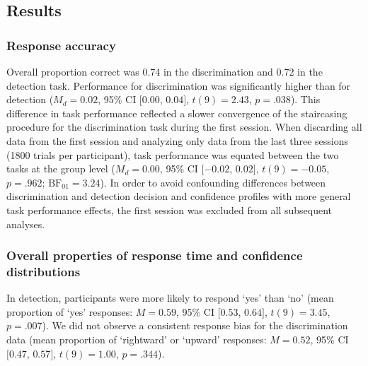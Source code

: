 \documentclass[12pt,twoside]{reedthesis}
\begin{document}
\hypertarget{results-4}{%
\subsection{Results}\label{results-4}}

\hypertarget{response-accuracy}{%
\subsubsection{Response accuracy}\label{response-accuracy}}

Overall proportion correct was 0.74 in the discrimination and 0.72 in the detection task. Performance for discrimination was significantly higher than for detection (\(M_d = 0.02\), 95\% CI \([0.00\), \(0.04]\), \(t(9) = 2.43\), \(p = .038\)). This difference in task performance reflected a slower convergence of the staircasing procedure for the discrimination task during the first session. When discarding all data from the first session and analyzing only data from the last three sessions (1800 trials per participant), task performance was equated between the two tasks at the group level (\(M_d = 0.00\), 95\% CI \([-0.02\), \(0.02]\), \(t(9) = -0.05\), \(p = .962\); \(\mathrm{BF}_{\textrm{01}} = 3.24\)). In order to avoid confounding differences between discrimination and detection decision and confidence profiles with more general task performance effects, the first session was excluded from all subsequent analyses.

\hypertarget{overall-properties-of-response-time-and-confidence-distributions}{%
\subsubsection{Overall properties of response time and confidence distributions}\label{overall-properties-of-response-time-and-confidence-distributions}}

In detection, participants were more likely to respond `yes' than `no' (mean proportion of `yes' responses: \(M = 0.59\), 95\% CI \([0.53\), \(0.64]\), \(t(9) = 3.45\), \(p = .007\)). We did not observe a consistent response bias for the discrimination data (mean proportion of `rightward' or `upward' responses: \(M = 0.52\), 95\% CI \([0.47\), \(0.57]\), \(t(9) = 1.00\), \(p = .344\)).
\end{document}
